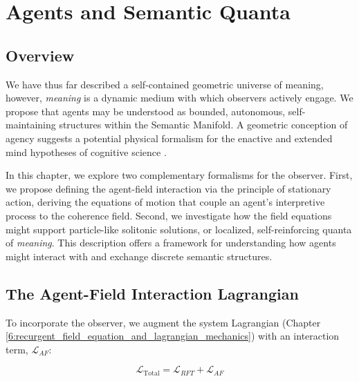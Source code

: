 \chapter{Agents and Semantic Quanta}
\label{13:agents_and_semantic_quanta}


\section{Overview}
\label{13.1:overview}

We have thus far described a self-contained geometric universe of meaning, however, \textit{meaning} is a dynamic medium with which observers actively engage. We propose that agents may be understood as bounded, autonomous, self-maintaining structures within the Semantic Manifold. A geometric conception of agency suggests a potential physical formalism for the enactive and extended mind hypotheses of cognitive science \autocite{VarelaThompsonRosch1991, ClarkChalmers1998}.

In this chapter, we explore two complementary formalisms for the observer. First, we propose defining the agent-field interaction via the principle of stationary action, deriving the equations of motion that couple an agent's interpretive process to the coherence field. Second, we investigate how the field equations might support particle-like solitonic solutions, or localized, self-reinforcing quanta of \textit{meaning}. This description offers a framework for understanding how agents might interact with and exchange discrete semantic structures.


\section{The Agent-Field Interaction Lagrangian}
\label{13.2:the_agent_field_interaction_lagrangian}

To incorporate the observer, we augment the system Lagrangian (Chapter \ref{6:recurgent_field_equation_and_lagrangian_mechanics}) with an interaction term, \(\mathcal{L}_{AF}\):

\begin{equation}
\mathcal{L}_{\text{Total}} = \mathcal{L}_{RFT} + \mathcal{L}_{AF}
\end{equation}


